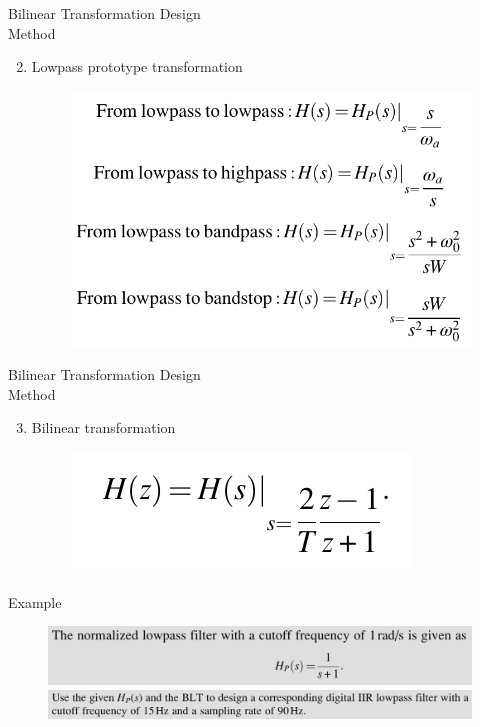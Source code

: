 \documentclass[pdflatex,compress,mathserif]{beamer}
\begin{document}
\begin{frame}{Bilinear Transformation Design\\Method}
    \begin{enumerate}
        \setcounter{enumi}{1}
        \item Lowpass prototype transformation
        \begin{figure}
            \centering
            \includegraphics[width=0.9\linewidth]{./img/img07.png}
        \end{figure}
    \end{enumerate}
\end{frame}

\begin{frame}{Bilinear Transformation Design\\Method}
    \begin{enumerate}
        \setcounter{enumi}{2}
        \item Bilinear transformation
        \begin{figure}
            \centering
            \includegraphics[width=0.5\linewidth]{./img/img08.png}
        \end{figure}
    \end{enumerate}
\end{frame}

\begin{frame}{Example}
    \begin{figure}
        \centering
        \includegraphics[width=\linewidth]{./img/img09a.png}
        \includegraphics[width=\linewidth]{./img/img09b.png}
    \end{figure}
\end{frame}
\end{document}
